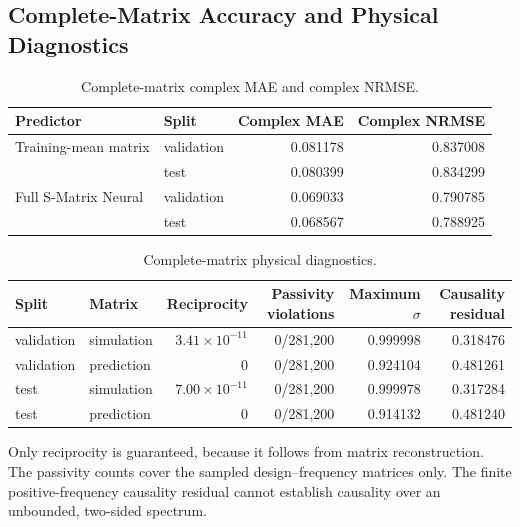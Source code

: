 \subsection{Complete-Matrix Accuracy and Physical Diagnostics}
\begin{table}[t]
    \caption{Complete-matrix complex MAE and complex NRMSE.}
    \label{tab:appendix-complex-errors}
    \centering
    \begin{tabular}{@{}llrr@{}}
        \toprule
        Predictor & Split & Complex MAE & Complex NRMSE \\
        \midrule
        Training-mean matrix & validation & 0.081178 & 0.837008 \\
                             & test       & 0.080399 & 0.834299 \\
        Full S-Matrix Neural & validation & 0.069033 & 0.790785 \\
                             & test       & 0.068567 & 0.788925 \\
        \bottomrule
    \end{tabular}
\end{table}

\begin{table}[t]
    \caption{Complete-matrix physical diagnostics.}
    \label{tab:appendix-physics}
    \centering
    \scriptsize
    \begin{tabular}{@{}llrrrr@{}}
        \toprule
        Split & Matrix & Reciprocity & Passivity violations
              & Maximum $\sigma$ & Causality residual \\
        \midrule
        validation & simulation & $3.41\times10^{-11}$ & 0/281,200
                   & 0.999998 & 0.318476 \\
        validation & prediction & 0 & 0/281,200
                   & 0.924104 & 0.481261 \\
        test & simulation & $7.00\times10^{-11}$ & 0/281,200
             & 0.999978 & 0.317284 \\
        test & prediction & 0 & 0/281,200
             & 0.914132 & 0.481240 \\
        \bottomrule
    \end{tabular}
\end{table}

Only reciprocity is guaranteed, because it follows from matrix reconstruction.
The passivity counts cover the sampled design--frequency matrices only. The
finite positive-frequency causality residual cannot establish causality over an
unbounded, two-sided spectrum.

